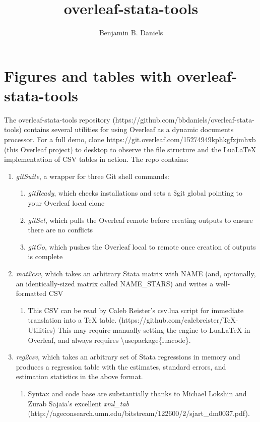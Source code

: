 \documentclass[a4paper]{article}
\title{overleaf-stata-tools}
\author{Benjamin B. Daniels}
\begin{document}
\maketitle

\section{Figures and tables with overleaf-stata-tools}

The overleaf-stata-tools repository (https://github.com/bbdaniels/overleaf-stata-tools) contains several utilities for using Overleaf as a dynamic documents processor. For a full demo, clone https://git.overleaf.com/15274949kphkgfxjmhxb (this Overleaf project) to desktop to observe the file structure and the LuaLaTeX implementation of CSV tables in action. The repo contains:

\begin{enumerate}
\item {\it gitSuite}, a wrapper for three Git shell commands:
	\begin{enumerate}
	\item {\it gitReady}, which checks installations and sets a \${git} global pointing to your Overleaf local clone
    \item {\it gitSet}, which pulls the Overleaf remote before creating outputs to ensure there are no conflicts
    \item {\it gitGo}, which pushes the Overleaf local to remote once creation of outputs is complete
    \end{enumerate}
\item {\it mat2csv}, which takes an arbitrary Stata matrix with NAME (and, optionally, an identically-sized matrix called NAME\_STARS) and writes a well-formatted CSV
	\begin{enumerate}
	\item This CSV can be read by Caleb Reister's csv.lua script for immediate translation into a TeX table. (https://github.com/calebreister/TeX-Utilities) This may require manually setting the engine to LuaLaTeX in Overleaf, and always requires \textbackslash usepackage\{luacode\}.
    \end{enumerate}
\item {\it reg2csv}, which takes an arbitrary set of Stata regressions in memory and produces a regression table with the estimates, standard errors, and estimation statistics in the above format.
	\begin{enumerate}
	\item Syntax and code base are substantially thanks to Michael Lokshin and Zurab Sajaia's excellent {\it xml\_tab} (http://ageconsearch.umn.edu/bitstream/122600/2/sjart\_dm0037.pdf).
    \end{enumerate}

\end{enumerate}
\end{document}
